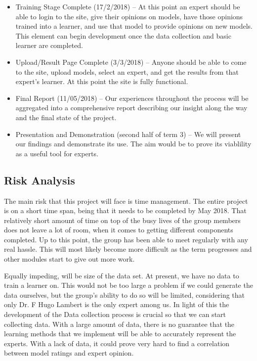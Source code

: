\documentclass{ecmm427_assignment}
\begin{document}
\begin{itemize}
\item Training Stage Complete (17/2/2018) – At this point an expert should be able to login to the site, give their opinions on models, have those opinions trained into a learner, and use that model to provide opinions on new models. This element can begin development once the data collection and basic learner are completed.

\item Upload/Result Page Complete (3/3/2018) – Anyone should be able to come to the site, upload models, select an expert, and get the results from that expert’s learner. At this point the site is fully functional.

\item Final Report (11/05/2018) – Our experiences throughout the process will be aggregated into a comprehensive report describing our insight along the way and the final state of the project.

\item Presentation and Demonstration (second half of term 3) – We will present our findings and demonstrate its use. The aim would be to prove its viablility as a useful tool for experts.

\end{itemize}

\subsection{Risk Analysis}

 The main risk that this project will face is time management. The entire project is on a short time span, being that it needs to be completed by May 2018. That relatively short amount of time on top of the busy lives of the group members does not leave a lot of room, when it comes to getting different components completed. Up to this point, the group has been able to meet regularly with any real hassle. This will most likely become more difficult as the term progresses and other modules start to give out more work. 

 Equally impeding, will be size of the data set. At present, we have no data to train a learner on. This would not be too large a problem if we could generate the data ourselves, but the group’s ability to do so will be limited, considering that only Dr. F Hugo Lambert is the only expert among us. In light of this the development of the Data collection process is crucial so that we can start collecting data. With a large amount of data, there is no guarantee that the learning methods that we implement will be able to accurately represent the experts. With a lack of data, it could prove very hard to find a correlation between model ratings and expert opinion.
\end{document}
